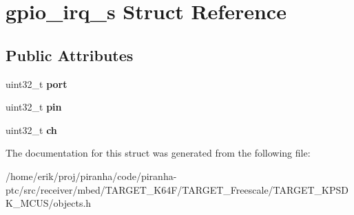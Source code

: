 \hypertarget{structgpio__irq__s}{}\section{gpio\+\_\+irq\+\_\+s Struct Reference}
\label{structgpio__irq__s}
\subsection*{Public Attributes}
\begin{DoxyCompactItemize}
\item 
uint32\+\_\+t {\bfseries port}\hypertarget{structgpio__irq__s_a4aa870dbe34e3681fc7251a9cad93565}{}\label{structgpio__irq__s_a4aa870dbe34e3681fc7251a9cad93565}

\item 
uint32\+\_\+t {\bfseries pin}\hypertarget{structgpio__irq__s_a75ad02dd8b4b62dca7d39c90deacd966}{}\label{structgpio__irq__s_a75ad02dd8b4b62dca7d39c90deacd966}

\item 
uint32\+\_\+t {\bfseries ch}\hypertarget{structgpio__irq__s_a6dc3c80d2e186a7807dda2cd13ff2f86}{}\label{structgpio__irq__s_a6dc3c80d2e186a7807dda2cd13ff2f86}

\end{DoxyCompactItemize}


The documentation for this struct was generated from the following file\+:\begin{DoxyCompactItemize}
\item 
/home/erik/proj/piranha/code/piranha-\/ptc/src/receiver/mbed/\+T\+A\+R\+G\+E\+T\+\_\+\+K64\+F/\+T\+A\+R\+G\+E\+T\+\_\+\+Freescale/\+T\+A\+R\+G\+E\+T\+\_\+\+K\+P\+S\+D\+K\+\_\+\+M\+C\+U\+S/objects.\+h\end{DoxyCompactItemize}
